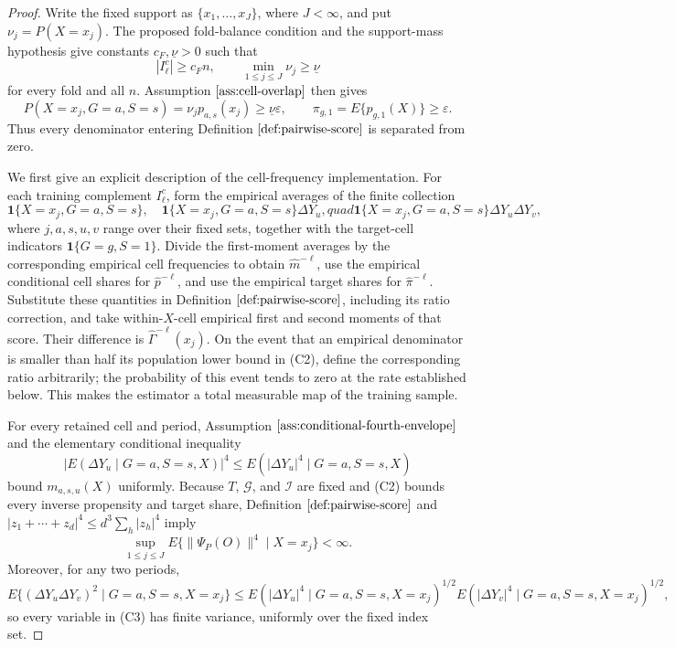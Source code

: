 \documentclass{article}
\begin{document}
\begin{proof}
Write the fixed support as \(\{x_1,\ldots,x_J\}\), where \(J<\infty\), and put \(\nu_j=P(X=x_j)\).  The proposed fold-balance condition and the support-mass hypothesis give constants \(c_F,\underline\nu>0\) such that
\[
 |I_\ell^c|\ge c_Fn,
 \qquad
 \min_{1\le j\le J}\nu_j\ge\underline\nu
 \tag{C1}
\]
for every fold and all \(n\).  Assumption \(\ref{ass:cell-overlap}\) then gives
\[
 P(X=x_j,G=a,S=s)=\nu_jp_{a,s}(x_j)
 \ge \underline\nu\varepsilon,
 \qquad
 \pi_{g,1}=E\{p_{g,1}(X)\}\ge\varepsilon.
 \tag{C2}
\]
Thus every denominator entering Definition \(\ref{def:pairwise-score}\) is separated from zero.

We first give an explicit description of the cell-frequency implementation.  For each training complement \(I_\ell^c\), form the empirical averages of the finite collection
\[
 \mathbf 1\{X=x_j,G=a,S=s\},\quad
 \mathbf 1\{X=x_j,G=a,S=s\}\Delta Y_u,quad
 \mathbf 1\{X=x_j,G=a,S=s\}\Delta Y_u\Delta Y_v,
 \tag{C3}
\]
where \(j,a,s,u,v\) range over their fixed sets, together with the target-cell indicators \(\mathbf 1\{G=g,S=1\}\).  Divide the first-moment averages by the corresponding empirical cell frequencies to obtain \(\widehat m^{-\ell}\), use the empirical conditional cell shares for \(\widehat p^{-\ell}\), and use the empirical target shares for \(\widehat\pi^{-\ell}\).  Substitute these quantities in Definition \(\ref{def:pairwise-score}\), including its ratio correction, and take within-\(X\)-cell empirical first and second moments of that score.  Their difference is \(\widehat\Gamma^{-\ell}(x_j)\).  On the event that an empirical denominator is smaller than half its population lower bound in (C2), define the corresponding ratio arbitrarily; the probability of this event tends to zero at the rate established below.  This makes the estimator a total measurable map of the training sample.

For every retained cell and period, Assumption \(\ref{ass:conditional-fourth-envelope}\) and the elementary conditional inequality
\[
 |E(\Delta Y_u\mid G=a,S=s,X)|^4
 \le E(|\Delta Y_u|^4\mid G=a,S=s,X)
 \tag{C4}
\]
bound \(m_{a,s,u}(X)\) uniformly.  Because \(T\), \(\mathcal G\), and \(\mathcal I\) are fixed and (C2) bounds every inverse propensity and target share, Definition \(\ref{def:pairwise-score}\) and \(|z_1+\cdots+z_d|^4\le d^3\sum_h|z_h|^4\) imply
\[
 \sup_{1\le j\le J}E\{\|\Psi_P(O)\|^4\mid X=x_j\}<\infty.
 \tag{C5}
\]
Moreover, for any two periods,
\[
 E\{(\Delta Y_u\Delta Y_v)^2\mid G=a,S=s,X=x_j\}
 \le
 E(|\Delta Y_u|^4\mid G=a,S=s,X=x_j)^{1/2}
 E(|\Delta Y_v|^4\mid G=a,S=s,X=x_j)^{1/2},
 \tag{C6}
\]
so every variable in (C3) has finite variance, uniformly over the fixed index set.


\end{proof}
\end{document}
